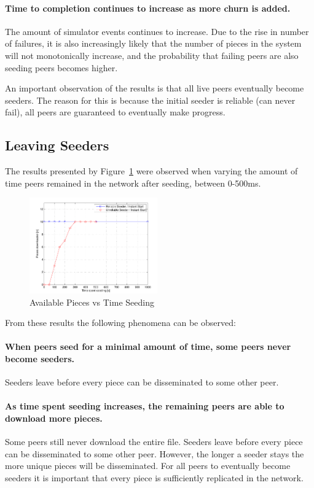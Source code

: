 \documentclass[a4paper,12pt,twocolumn]{article}
\newcommand{\fref}[1]{Figure~\ref{#1}}
\begin{document}
\paragraph{Time to completion continues to increase as more churn is added.}
The amount of simulator events continues to increase. Due to the rise in number of failures, it is also increasingly likely that the number of pieces in the system will not monotonically increase, and the probability that failing peers are also seeding peers becomes higher.

An important observation of the results is that all live peers eventually become seeders. The reason for this is because the initial seeder is reliable (can never fail), all peers are guaranteed to eventually make progress.

\subsection{Leaving Seeders}
\label{subsec:leaving_seeders_results}

The results presented by \fref{fig:time_seeding} were observed when varying the amount of time peers remained in the network after seeding, between 0-500ms.

\begin{figure}[!htbp]
  \centering
  \includegraphics[width=0.49\textwidth]{figs/Experiment6_PIECES}
  \caption{Available Pieces vs Time Seeding}
  \label{fig:time_seeding}
\end{figure}

From these results the following phenomena can be observed:

\paragraph{When peers seed for a minimal amount of time, some peers never become seeders.} Seeders leave before every piece can be disseminated to some other peer.

\paragraph{As time spent seeding increases, the remaining peers are able to download more pieces.} Some peers still never download the entire file. Seeders leave before every piece can be disseminated to some other peer. 
However, the longer a seeder stays the more unique pieces will be disseminated. For all peers to eventually become seeders it is important that every piece is sufficiently replicated in the network.
\end{document}
